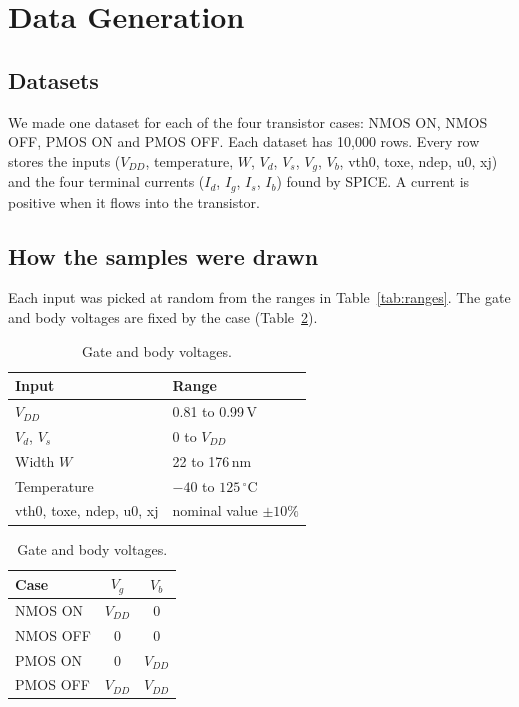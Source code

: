 \documentclass[11pt]{article}
\begin{document}
\section{Data Generation}
\label{sec:data}

\subsection{Datasets}

We made one dataset for each of the four transistor cases: NMOS ON, NMOS OFF,
PMOS ON and PMOS OFF. Each dataset has 10{,}000 rows. Every row stores the
inputs ($V_{DD}$, temperature, $W$, $V_d$, $V_s$, $V_g$, $V_b$, vth0, toxe,
ndep, u0, xj) and the four terminal currents ($I_d$, $I_g$, $I_s$, $I_b$)
found by SPICE. A current is positive when it flows into the transistor.

\subsection{How the samples were drawn}

Each input was picked at random from the ranges in
Table~\ref{tab:ranges}. The gate and body voltages are fixed by the case
(Table~\ref{tab:vgvb}).

\begin{table}[H]
\centering
\begin{minipage}{0.6\textwidth}
\centering
\begin{tabular}{ll}
\toprule
Input & Range \\
\midrule
$V_{DD}$ & 0.81 to 0.99\,V \\
$V_d$, $V_s$ & 0 to $V_{DD}$ \\
Width $W$ & 22 to 176\,nm \\
Temperature & $-40$ to $125\,^\circ$C \\
vth0, toxe, ndep, u0, xj & nominal value $\pm 10\%$ \\
\bottomrule
\end{tabular}
\caption{Ranges of the sampled inputs.}
\label{tab:ranges}
\end{minipage}%
\begin{minipage}{0.38\textwidth}
\centering
\begin{tabular}{lcc}
\toprule
Case & $V_g$ & $V_b$ \\
\midrule
NMOS ON  & $V_{DD}$ & 0 \\
NMOS OFF & 0 & 0 \\
PMOS ON  & 0 & $V_{DD}$ \\
PMOS OFF & $V_{DD}$ & $V_{DD}$ \\
\bottomrule
\end{tabular}
\caption{Gate and body voltages.}
\label{tab:vgvb}
\end{minipage}
\end{table}
\end{document}
